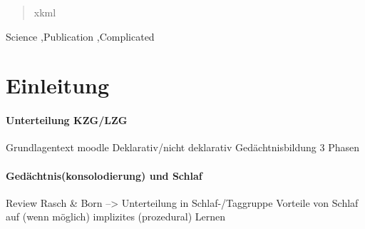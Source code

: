 





\begin{frontmatter}
\begin{abstract}
    xkml
\end{abstract}
\begin{keyword}
Science \sep Publication \sep Complicated
\end{keyword}
\end{frontmatter}





\newpage


\newpage



\tableofcontents
\clearpage
{}

\section{Einleitung}
\label{S:1}


\paragraph{Unterteilung KZG/LZG}
Grundlagentext moodle
Deklarativ/nicht deklarativ
Gedächtnisbildung 3 Phasen

\paragraph{Gedächtnis(konsolodierung) und Schlaf}
Review Rasch \& Born
--> Unterteilung in Schlaf-/Taggruppe
Vorteile von Schlaf auf (wenn möglich) implizites (prozedural) Lernen

